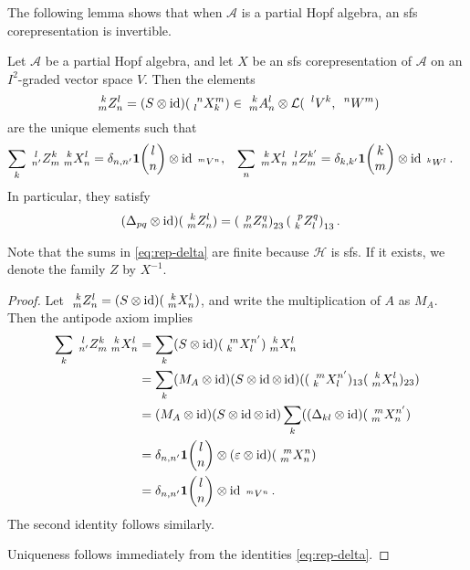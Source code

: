 
The following lemma shows that when $\mathscr{A}$ is a partial Hopf algebra, an sfs corepresentation is invertible.

\begin{Lem} \label{lemma:rep-corep} Let $\mathscr{A}$ be a partial Hopf algebra, and let $X$ be an sfs corepresentation of $\mathscr{A}$ on an $I^2$-graded vector space $V$.
  Then the elements %
  \[\Gr{Z}{k}{l}{m}{n} =(S \otimes
  \id)(\Gr{X}{n}{m}{l}{k}) \in
    \Gr{A}{k}{l}{m}{n} \otimes
    \mathcal{L}(\Gru{V}{l}{k},\Gru{W}{n}{m})\] are the unique elements such  that
  \begin{align}\label{eq:rep-delta}
    \sum_{k} \Gr{Z}{l}{k}{n'}{m} \Gr{X}{k}{l}{m}{n} &= \delta_{n,n'}
    \UnitC{l}{n} \otimes \id_{\Gru{V}{m}{n}}, &
    \sum_{n} \Gr{X}{k}{l}{m}{n} \Gr{Z}{l}{k'}{n}{m} &= \delta_{k,k'}
    \UnitC{k}{m}\otimes \id_{\Gru{W}{k}{l}}.
  \end{align}
   In particular, they satisfy
  \begin{align*}
    (\Delta_{pq} \otimes \id)(\Gr{Z}{k}{l}{m}{n}) &=
    \left(\Gr{Z}{p}{q}{m}{n}\right)_{23}\left(\Gr{Z}{p}{q}{k}{l}\right)_{13}.
  \end{align*}
\end{Lem}
Note that the sums in \eqref{eq:rep-delta} are finite because $\mathcal{H}$ is sfs. If it exists, we denote the family $Z$ by $X^{-1}$.
\begin{proof}
 Let  $\Gr{Z}{k}{l}{m}{n}=(S \otimes \id)(\Gr{X}{k}{l}{m}{n})$, and write the multiplication of $A$ as $M_A$. Then the antipode axiom implies
   \begin{align*}
     \sum_{k} \Gr{Z}{l}{k}{n'}{m} \Gr{X}{k}{l}{m}{n} &= \sum_{k}
     (S\otimes \id)(\Gr{X}{m}{n'}{k}{l}) \Gr{X}{k}{l}{m}{n}
     \\
     &=\sum_{k} (M_A \otimes \id)(S\otimes \id \otimes \id) (
     (\Gr{X}{m}{n
       '}{k}{l})_{13}(\Gr{X}{k}{l}{m}{n})_{23}) \\
     &= (M_A\otimes \id)(S\otimes \id \otimes \id)\sum_{k}((\Delta_{kl}
     \otimes \id)(\Gr{X}{m}{n'}{m}{n}) \\
     &= \delta_{n,n'} \UnitC{l}{n}\otimes (\varepsilon\otimes \id)(\Gr{X}{m}{n}{m}{n}) \\
     &= \delta_{n,n'}\UnitC{l}{n} \otimes 
     \id_{\Gru{V}{m}{n}}.
   \end{align*} The second identity follows
   similarly.

 Uniqueness follows immediately from the identities  \eqref{eq:rep-delta}.
\end{proof}

